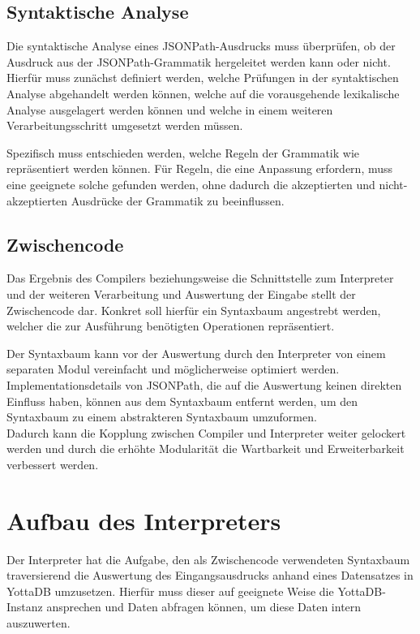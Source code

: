 \documentclass[oneside]{ausarbeitung}
\begin{document}
	
\subsection{Syntaktische Analyse}

Die syntaktische Analyse eines JSONPath-Ausdrucks muss überprüfen, ob der Ausdruck aus der JSONPath-Grammatik hergeleitet werden kann oder nicht. Hierfür muss zunächst definiert werden, welche Prüfungen in der syntaktischen Analyse abgehandelt werden können, welche auf die vorausgehende lexikalische Analyse ausgelagert werden können und welche in einem weiteren Verarbeitungsschritt umgesetzt werden müssen.

Spezifisch muss entschieden werden, welche Regeln der Grammatik wie repräsentiert werden können. Für Regeln, die eine Anpassung erfordern, muss eine geeignete solche gefunden werden, ohne dadurch die akzeptierten und nicht-akzeptierten Ausdrücke der Grammatik zu beeinflussen.


	
\subsection{Zwischencode}

Das Ergebnis des Compilers beziehungsweise die Schnittstelle zum Interpreter und der weiteren Verarbeitung und Auswertung der Eingabe stellt der Zwischencode dar. Konkret soll hierfür ein Syntaxbaum angestrebt werden, welcher die zur Ausführung benötigten Operationen repräsentiert. 

Der Syntaxbaum kann vor der Auswertung durch den Interpreter von einem separaten Modul vereinfacht und möglicherweise optimiert werden. Implementationsdetails von JSONPath, die auf die Auswertung keinen direkten Einfluss haben, können aus dem Syntaxbaum entfernt werden, um den Syntaxbaum zu einem abstrakteren Syntaxbaum umzuformen. \\
Dadurch kann die Kopplung zwischen Compiler und Interpreter weiter gelockert werden und durch die erhöhte Modularität die Wartbarkeit und Erweiterbarkeit verbessert werden.


\pagebreak
	
\section{Aufbau des Interpreters}

Der Interpreter hat die Aufgabe, den als Zwischencode verwendeten Syntaxbaum traversierend die Auswertung des Eingangsausdrucks anhand eines Datensatzes in YottaDB umzusetzen. Hierfür muss dieser auf geeignete Weise die YottaDB-Instanz ansprechen und Daten abfragen können, um diese Daten intern auszuwerten.
\end{document}
